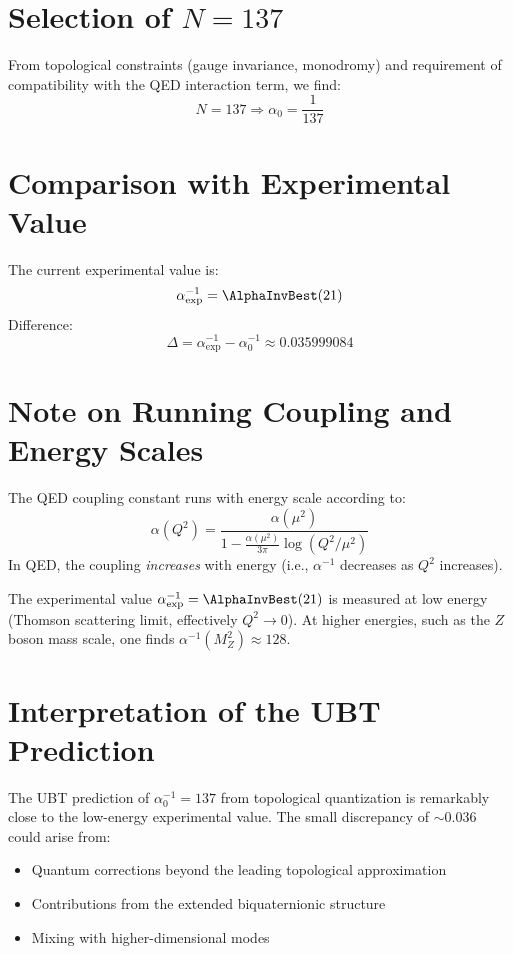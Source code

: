\documentclass[12pt, a4paper]{article}
\begin{document}
\section{Selection of \( N = 137 \)}

From topological constraints (gauge invariance, monodromy) and requirement of compatibility with the QED interaction term, we find:
\[
N = 137 \Rightarrow \alpha_0 = \frac{1}{137}
\]

\section{Comparison with Experimental Value}

The current experimental value is:
\[
\alpha_{\text{exp}}^{-1} = \AlphaInvBest(21)
\]
Difference:
\[
\Delta = \alpha_{\text{exp}}^{-1} - \alpha_0^{-1} \approx 0.035999084
\]

\section{Note on Running Coupling and Energy Scales}

The QED coupling constant runs with energy scale according to:
\[
\alpha(Q^2) = \frac{\alpha(\mu^2)}{1 - \frac{\alpha(\mu^2)}{3\pi} \log(Q^2/\mu^2)}
\]
In QED, the coupling \emph{increases} with energy (i.e., $\alpha^{-1}$ decreases as $Q^2$ increases).

The experimental value $\alpha_{\text{exp}}^{-1} = \AlphaInvBest(21)$ is measured at low energy (Thomson scattering limit, effectively $Q^2 \to 0$). At higher energies, such as the $Z$ boson mass scale, one finds $\alpha^{-1}(M_Z^2) \approx 128$.

\section{Interpretation of the UBT Prediction}

The UBT prediction of $\alpha_0^{-1} = 137$ from topological quantization is remarkably close to the low-energy experimental value. The small discrepancy of $\sim 0.036$ could arise from:
\begin{itemize}
\item Quantum corrections beyond the leading topological approximation
\item Contributions from the extended biquaternionic structure
\item Mixing with higher-dimensional modes
\end{itemize}
\end{document}
